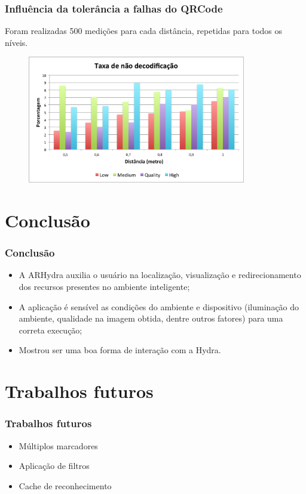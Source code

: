 \documentclass{beamer}
\begin{document}
	\begin{frame}
		\frametitle{Influência da tolerância a falhas do QRCode}
		
		Foram realizadas 500 medições para cada distância, repetidas para todos os níveis.
		
		\begin{figure}[htb]
			\begin{center}
					\includegraphics[width=0.85\textwidth]{figuras/grafico_nivel_decode.png}
			\end{center}
		\end{figure}
	\end{frame}

\section{Conclusão}
\begin{frame}
	\frametitle{Conclusão}
	
	\begin{itemize}
	  \item A ARHydra auxilia o usuário na localização, visualização e redirecionamento
	  		dos recursos presentes no ambiente inteligente;
	  \item A aplicação é sensível as condições do ambiente e dispositivo (iluminação do 
	  		ambiente, qualidade na imagem obtida, dentre outros fatores) para uma correta
	  		execução;
	  \item Mostrou ser uma boa forma de interação com a Hydra. 
	\end{itemize}
	
\end{frame}


\section{Trabalhos futuros}
	\begin{frame}
		\frametitle{Trabalhos futuros}
		\begin{itemize}
		  \item Múltiplos marcadores
		  \item Aplicação de filtros
		  \item Cache de reconhecimento
		\end{itemize}
	\end{frame}
\end{document}
